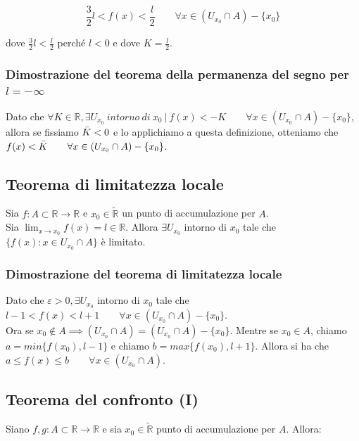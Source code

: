 \documentclass{article}
\begin{document}
\begin{equation*}
    \frac{3}{2}l < f(x) < \frac{l}{2} \qquad \forall x \in (U_{x_0} \cap A) - \{x_0\}
\end{equation*}

\noindent dove $\frac{3}{2} l < \frac{l}{2}$ perché $l < 0$ e dove $K = \frac{l}{2}$.

\subsubsection{Dimostrazione del teorema della permanenza del segno per $l = - \infty$}
Dato che $\forall K \in \mathbb{R}, \exists U_{x_0} \ intorno \ di \ x_0 \ | \ f(x) < -K \qquad \forall x \in (U_{x_0} \cap A) - \{x_0\}$, allora se fissiamo $\Bar{K} < 0$ e lo applichiamo a questa definizione, otteniamo che $f(x) < \Bar{K} \qquad \forall x \in (U_{x_0} \cap A) - \{x_0\}$.

\subsection{Teorema di limitatezza locale}
Sia $f: A \subset \mathbb{R} \xrightarrow{} \mathbb{R}$ e $x_0 \in \widetilde{\mathbb{R}}$ un punto di accumulazione per $A$.\\
Sia $\lim_{x \to x_0} f(x) = l \in \mathbb{R}$. Allora $\exists U_{x_0}$ intorno di $x_0$ tale che $\{f(x) : x \in U_{x_0} \cap A\}$ è limitato.

\subsubsection{Dimostrazione del teorema di limitatezza locale}
Dato che $\varepsilon > 0, \exists U_{x_0}$ intorno di $x_0$ tale che $l - 1 < f(x) < l + 1 \qquad \forall x \in (U_{x_0} \cap A) - \{x_0\}$.\\
Ora se $x_0 \notin A \implies (U_{x_0} \cap A) = (U_{x_0} \cap A) - \{x_0\}$. Mentre se $x_0 \in A$, chiamo $a = min\{f(x_0), l - 1\}$ e chiamo $b = max\{f(x_0), l + 1\}$. Allora si ha che $a \leq f(x) \leq b \qquad \forall x \in (U_{x_0} \cap A)$.

\subsection{Teorema del confronto (I)}
Siano $f, g: A \subset \mathbb{R} \xrightarrow{} \mathbb{R}$ e sia $x_0 \in \widetilde{\mathbb{R}}$ punto di accumulazione per $A$. Allora:
\end{document}
